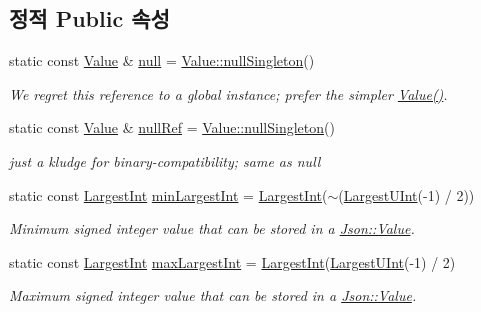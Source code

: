 \subsection*{정적 Public 속성}
\begin{DoxyCompactItemize}
\item 
static const \hyperlink{class_json_1_1_value}{Value} \& \hyperlink{class_json_1_1_value_a21ddb05b92c60c7548e928bf371e7d45}{null} = \hyperlink{class_json_1_1_value_af2f124567acc35d021a424e53ebdfcab}{Value\+::null\+Singleton}()
\begin{DoxyCompactList}\small\item\em We regret this reference to a global instance; prefer the simpler \hyperlink{class_json_1_1_value_ada6ba1369448fb0240bccc36efaa46f7}{Value()}. \end{DoxyCompactList}\item 
static const \hyperlink{class_json_1_1_value}{Value} \& \hyperlink{class_json_1_1_value_aaee27e622f87266f861216d644603730}{null\+Ref} = \hyperlink{class_json_1_1_value_af2f124567acc35d021a424e53ebdfcab}{Value\+::null\+Singleton}()
\begin{DoxyCompactList}\small\item\em just a kludge for binary-\/compatibility; same as null \end{DoxyCompactList}\item 
static const \hyperlink{class_json_1_1_value_a1cbb82642ed05109b9833e49f042ece7}{Largest\+Int} \hyperlink{class_json_1_1_value_af91df130daa50dd43d2cd89e6ee67706}{min\+Largest\+Int} = \hyperlink{class_json_1_1_value_a1cbb82642ed05109b9833e49f042ece7}{Largest\+Int}($\sim$(\hyperlink{class_json_1_1_value_a6682a3684d635e03fc06ba229fa24eec}{Largest\+U\+Int}(-\/1) / 2))
\begin{DoxyCompactList}\small\item\em Minimum signed integer value that can be stored in a \hyperlink{class_json_1_1_value}{Json\+::\+Value}. \end{DoxyCompactList}\item 
static const \hyperlink{class_json_1_1_value_a1cbb82642ed05109b9833e49f042ece7}{Largest\+Int} \hyperlink{class_json_1_1_value_a8b4977696f13296fa8755c7953fafb2f}{max\+Largest\+Int} = \hyperlink{class_json_1_1_value_a1cbb82642ed05109b9833e49f042ece7}{Largest\+Int}(\hyperlink{class_json_1_1_value_a6682a3684d635e03fc06ba229fa24eec}{Largest\+U\+Int}(-\/1) / 2)
\begin{DoxyCompactList}\small\item\em Maximum signed integer value that can be stored in a \hyperlink{class_json_1_1_value}{Json\+::\+Value}. \end{DoxyCompactList}\item 

\end{DoxyCompactItemize}
